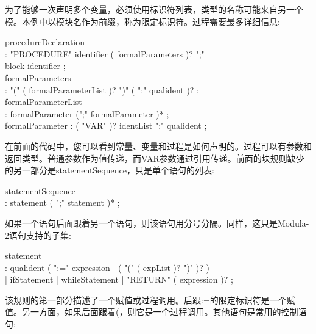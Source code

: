 为了能够一次声明多个变量，必须使用标识符列表，类型的名称可能来自另一个模。本例中以模块名作为前缀，称为限定标识符。过程需要最多详细信息:\par

\begin{tcolorbox}[colback=white,colframe=black]
procedureDeclaration \\
\hspace*{0.5cm}: "PROCEDURE" identifier ( formalParameters )? ";" \\
\hspace*{1cm}block identifier ; \\
formalParameters \\
\hspace*{0.5cm}: "(" ( formalParameterList )? ")" ( ":" qualident )? ; \\
formalParameterList \\
\hspace*{0.5cm}: formalParameter (";" formalParameter )* ; \\
formalParameter : ( "VAR" )? identList ":" qualident ;
\end{tcolorbox}

在前面的代码中，您可以看到常量、变量和过程是如何声明的。过程可以有参数和返回类型。普通参数作为值传递，而VAR参数通过引用传递。前面的块规则缺少的另一部分是statementSequence，只是单个语句的列表:\par

\begin{tcolorbox}[colback=white,colframe=black]
statementSequence \\
\hspace*{0.5cm}: statement ( ";" statement )* ;
\end{tcolorbox}

如果一个语句后面跟着另一个语句，则该语句用分号分隔。同样，这只是Modula-2语句支持的子集:\par

\begin{tcolorbox}[colback=white,colframe=black]
statement \\
\hspace*{0.5cm}: qualident ( ":=" expression | ( "(" ( expList )? ")" )? ) \\
\hspace*{0.5cm}| ifStatement | whileStatement | "RETURN" ( expression )? ;
\end{tcolorbox}

该规则的第一部分描述了一个赋值或过程调用。后跟:=的限定标识符是一个赋值。另一方面，如果后面跟着(，则它是一个过程调用。其他语句是常用的控制语句:\par

